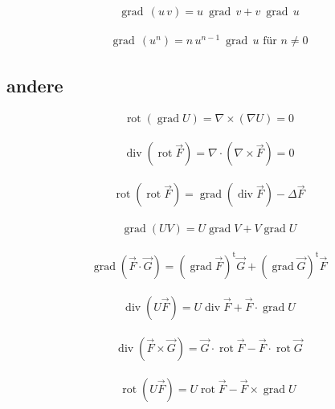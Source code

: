 \documentclass[a4paper]{scrartcl}
\begin{document}
\begin{align}
\operatorname{grad}\,(u\, v) = u\ \operatorname{grad}\,v + v\ \operatorname{grad}\,u
\end{align}


\begin{align}
\label{eqn:ProduktregelEinesGradientMitPotenzen}
\operatorname{grad}\,(u^n) = n\, u^{n-1}\ \operatorname{grad}\,u \text{ für } n\neq 0
\end{align}


\subsection{andere}
\begin{align}
\operatorname{rot}(\operatorname{grad}U)=\nabla \times (\nabla U) = 0
\end{align}

\begin{align}
\operatorname{div}(\operatorname{rot}\vec{F}) = \nabla \cdot (\nabla \times
\vec F) = 0
\end{align}

\begin{align}
\operatorname{rot}(\operatorname{rot}\vec{F}) =
\operatorname{grad}(\operatorname{div}\vec{F}) -\Delta \vec{F}
\end{align}

\begin{align}
\operatorname{grad}(UV)=U\operatorname{grad}V+V\operatorname{grad}U
\end{align}

\begin{align}
\operatorname{grad}(\vec{F}\cdot \vec{G}) =
(\operatorname{grad}\vec{F})^{\operatorname t}\vec{G} + (\operatorname{grad}\vec{G})^{\operatorname t}\vec{F}
\end{align}

\begin{align}
\operatorname{div}(U\vec{F})=U\operatorname{div}\vec{F}+
\vec{F}\cdot\operatorname{grad}U
\end{align}

\begin{align}
\operatorname{div}(\vec{F}\times \vec{G})= \vec{G} \cdot
\operatorname{rot}\vec{F} -\vec{F}\cdot\operatorname{rot}\vec{G}
\end{align}

\begin{align}
\operatorname{rot}(U\vec{F})= U\operatorname{rot}\vec{F}
-\vec{F}\times\operatorname{grad}U\
\end{align}
\end{document}
